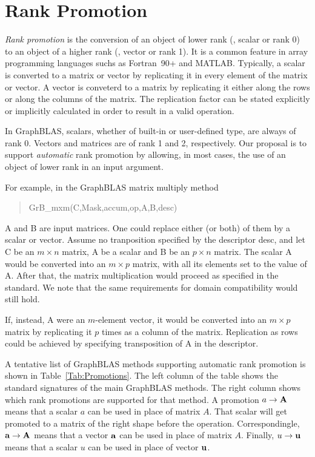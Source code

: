 \section{Rank Promotion}
\label{Sec:promotion}

\renewcommand{\vector}[1]{{\bf #1}}
\renewcommand{\matrix}[1]{{\bf #1}}

\emph{Rank promotion} is the conversion of an object of lower rank (\eg,
scalar or rank 0) to an object of a higher rank (\eg, vector or rank 1).
It is a common feature in array programming languages suchs as Fortran~90+
and MATLAB.  Typically, a scalar is converted to a matrix or vector
by replicating it in every element of the matrix or vector. A vector is
conveterd to a matrix by replicating it either along the rows or along the
columns of the matrix.  The replication factor can be stated explicitly
or implicitly calculated in order to result in a valid operation.

In GraphBLAS, scalars, whether of built-in or user-defined type, are
always of rank 0. Vectors and matrices are of rank 1 and 2, respectively.
Our proposal is to support \emph{automatic} rank promotion by allowing,
in most cases, the use of an object of lower rank in an input argument.

For example, in the GraphBLAS matrix multiply method 
\begin{quote} 
{\sf GrB\_mxm(C,Mask,accum,op,A,B,desc)}
\end{quote}
{\sf A} and {\sf B} are input matrices. One could replace either (or both)
of them by a scalar or vector.  Assume no tranposition specified by the
descriptor {\sf desc}, and let {\sf C} be an $m \times n$ matrix, {\sf A}
be a scalar and {\sf B} be an $p \times n$ matrix. The scalar {\sf A}
would be converted into an $m \times p$ matrix, with all its elements
set to the value of {\sf A}.  After that, the matrix multiplication would
proceed as specified in the standard.  We note that the same requirements
for domain compatibility would still hold.

If, instead, {\sf A} were an $m$-element vector, it would be converted
into an $m \times p$ matrix by replicating it $p$ times as a column
of the matrix.  Replication as rows could be achieved by specifying
transposition of {\sf A} in the descriptor.

A tentative list of GraphBLAS methods supporting automatic rank promotion
is shown in Table~\ref{Tab:Promotions}.  The left column of the table
shows the standard signatures of the main GraphBLAS methods. The right
column shows which rank promotions are supported for that method. A
promotion $a \rightarrow \matrix{A}$ means that a scalar $a$ can be
used in place of matrix $A$. That scalar will get promoted to a matrix
of the right shape before the operation.  Correspondingle, $\vector{a}
\rightarrow \matrix{A}$ means that a vector $\vector{a}$ can be used in
place of matrix $A$. Finally, $u \rightarrow \vector{u}$ means that a
scalar $u$ can be used in place of vector $\vector{u}$.

